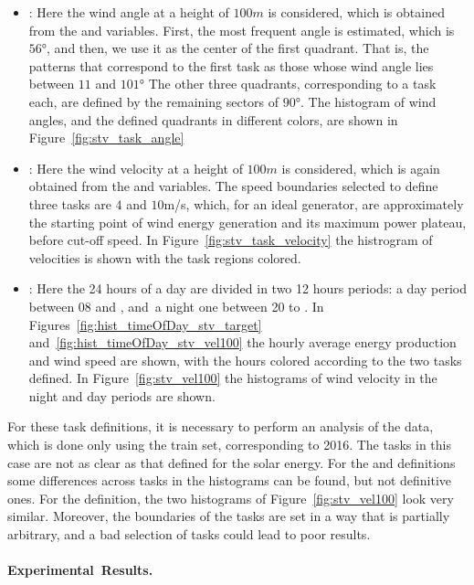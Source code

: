 \begin{itemize}
    \item {}: Here the wind angle at a height of $100m$ is considered, which is obtained from the  and  variables. 
    First, the most frequent angle is estimated, which is $\ang{56}$, and then, we use it as the center of the first quadrant. That is, the patterns that correspond to the first task as those whose wind angle lies between ${11}$ and $\ang{101}$  The other three quadrants, corresponding to a task each, are defined by the remaining sectors of $\ang{90}$.
    The histogram of wind angles, and the defined quadrants in different colors, are shown in Figure~\ref{fig:stv_task_angle}
    \item {}: Here the wind velocity at a height of $100m$ is considered, which is again obtained from the  and  variables. The speed boundaries selected to define three tasks are $4$ and $10$m/s, which, for an ideal generator, are approximately the starting point of wind energy generation and its maximum power plateau, before cut-off speed.   
    In Figure~\ref{fig:stv_task_velocity} the histrogram of velocities is shown with the task regions colored. 
    \item {}: Here the 24 hours of a day are divided in two 12 hours periods: a day period between 08 and , and~a night one between 20 to .
    In Figures~\ref{fig:hist_timeOfDay_stv_target} and~\ref{fig:hist_timeOfDay_stv_vel100} the hourly average energy production and wind speed are shown, with the hours colored according to the two tasks defined. In Figure~\ref{fig:stv_vel100} the histograms of wind velocity in the night and day periods are shown.
\end{itemize}
%
For these task definitions, it is necessary to perform an analysis of the data, which is done only using the train set, corresponding to 2016.
The tasks in this case are not as clear as that defined for the solar energy. For the  and  definitions some differences across tasks in the histograms can be found, but not definitive ones.
For the  definition, the two histograms of Figure~\ref{fig:stv_vel100} look very similar.
Moreover, the boundaries of the tasks are set in a way that is partially arbitrary, and a bad selection of tasks could lead to poor results.


\paragraph*{Experimental~Results.\\}


